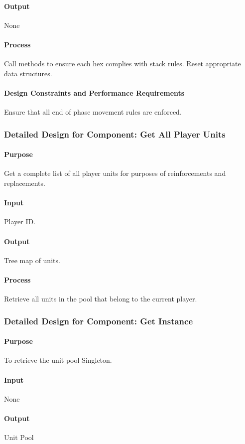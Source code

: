 \documentclass[12pt,a4paper,titlepage]{article}
\begin{document}
\paragraph{Output} None
\paragraph{Process} Call methods to ensure each hex complies with stack rules. Reset appropriate data structures.
\paragraph{Design Constraints and Performance Requirements} Ensure that all end of phase movement rules are enforced.

\subsubsection{Detailed Design for Component: Get All Player Units}
\paragraph{Purpose} Get a complete list of all player units for purposes of reinforcements and replacements.
\paragraph{Input} Player ID.
\paragraph{Output} Tree map of units.
\paragraph{Process} Retrieve all units in the pool that belong to the current player.

\subsubsection{Detailed Design for Component: Get Instance}
\paragraph{Purpose} To retrieve the unit pool Singleton.
\paragraph{Input} None
\paragraph{Output} Unit Pool
\end{document}
